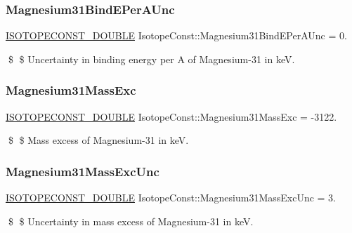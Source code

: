 \subsubsection{\texorpdfstring{Magnesium31\+Bind\+E\+Per\+A\+Unc}{Magnesium31BindEPerAUnc}}
{\footnotesize\ttfamily \mbox{\hyperlink{group___isotope_const-_macros_ga8f45a7272ce02c0b4c65c44636ed719a}{I\+S\+O\+T\+O\+P\+E\+C\+O\+N\+S\+T\+\_\+\+D\+O\+U\+B\+LE}} Isotope\+Const\+::\+Magnesium31\+Bind\+E\+Per\+A\+Unc = 0.}

\$ \$ Uncertainty in binding energy per A of Magnesium-\/31 in keV. \mbox{\label{group___isotope_const-_magnesium-_mg31_ga9e07cd31f936ca9ab1bd96f928b4a678}} 
\subsubsection{\texorpdfstring{Magnesium31\+Mass\+Exc}{Magnesium31MassExc}}
{\footnotesize\ttfamily \mbox{\hyperlink{group___isotope_const-_macros_ga8f45a7272ce02c0b4c65c44636ed719a}{I\+S\+O\+T\+O\+P\+E\+C\+O\+N\+S\+T\+\_\+\+D\+O\+U\+B\+LE}} Isotope\+Const\+::\+Magnesium31\+Mass\+Exc = -\/3122.}

\$ \$ Mass excess of Magnesium-\/31 in keV. \mbox{\label{group___isotope_const-_magnesium-_mg31_ga854241f2f05ea1e98cd0e685304e98cd}} 
\subsubsection{\texorpdfstring{Magnesium31\+Mass\+Exc\+Unc}{Magnesium31MassExcUnc}}
{\footnotesize\ttfamily \mbox{\hyperlink{group___isotope_const-_macros_ga8f45a7272ce02c0b4c65c44636ed719a}{I\+S\+O\+T\+O\+P\+E\+C\+O\+N\+S\+T\+\_\+\+D\+O\+U\+B\+LE}} Isotope\+Const\+::\+Magnesium31\+Mass\+Exc\+Unc = 3.}

\$ \$ Uncertainty in mass excess of Magnesium-\/31 in keV. \mbox{\label{group___isotope_const-_magnesium-_mg31_ga223b6fcba4e391e2172050d6f4452ad1}} 

